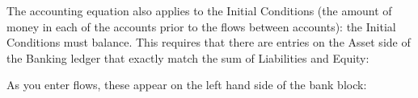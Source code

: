 \begin{center}
\par\end{center}

The accounting equation also applies to the Initial Conditions (the
amount of money in each of the accounts prior to the flows between
accounts): the Initial Conditions must balance. This requires that
there are entries on the Asset side of the Banking ledger that exactly
match the sum of Liabilities and Equity:


\begin{center}
\par\end{center}

As you enter flows, these appear on the left hand side of the bank
block:
\begin{center}
\par\end{center}

